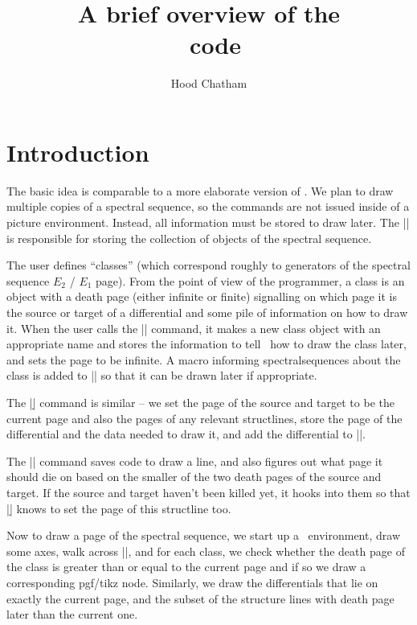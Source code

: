 

\def\eatclnifpresent#1{#1}
\def\pgfkeysname{pgfkeys}
\def\file#1{\path{#1.code.tex}}

\title{A brief overview of the \\ \sseqpages\ code}
\author{Hood Chatham\\\mailtoHC}
\maketitle
\section{Introduction}
The basic idea is comparable to a more elaborate version of \tikzcdpkg.
We plan to draw multiple copies of a spectral sequence, so the commands are not issued inside of a picture environment.
Instead, all information must be stored to draw later. The |\sseq@savedpaths| is responsible for storing the collection of objects of the spectral sequence.

The user defines ``classes'' (which correspond roughly to generators of the spectral sequence $E_2$ / $E_1$ page).
From the point of view of the programmer, a class is an object with a death page (either infinite or finite) signalling on which page it is the source or target of a differential
and some pile of information on how to draw it. When the user calls the |\class| command, it makes a new class object with an appropriate name and stores the
information to tell \spectralsequences\ how to draw the class later, and sets the page to be infinite. A macro informing spectralsequences about the class
is added to |\sseq@savedpaths| so that it can be drawn later if appropriate.

The |\d| command is similar -- we set the page of the source and target to be the current page and also the pages of any relevant structlines, store the page of the differential and the data needed to draw it, and add the differential to |\sseq@savedpaths|.

The |\structline| command saves code to draw a line, and also figures out what page it should die on based on the smaller of the two death pages of the source and target. If the source and target haven't been killed yet, it hooks into them so that |\d| knows to set the page of this structline too.

Now to draw a page of the spectral sequence, we start up a \tikzpictureenv\ environment, draw some axes,
walk across |\sseq@savedpaths|, and for each class, we check whether the death page of the class is greater than or equal to the current page and if so we draw a corresponding
pgf/tikz node. Similarly, we draw the differentials that lie on exactly the current page, and the subset of the structure lines with death page later than the current one.

